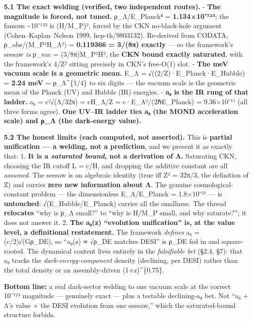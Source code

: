 \documentclass[
]{article}
\begin{document}
\textbf{5.1 The exact welding (verified, two independent routes).} -
\textbf{The magnitude is forced, not tuned.} ρ\_Λ/E\_Planck⁴ =
\textbf{1.134×10⁻¹²³}; the famous \textasciitilde10⁻¹²² is (H/M\_P)²,
forced by the CKN no-black-hole argument (Cohen--Kaplan--Nelson 1999,
hep-th/9803132). Re-derived from CODATA, ρ\_obs/(M\_P²H\_Λ²) =
\textbf{0.119366 = 3/(8π) exactly} --- so the framework's seesaw
\emph{is} ρ\_vac = (3/8π)M\_P²H², the \textbf{CKN bound exactly
saturated}, with the framework's 4/Z² sitting precisely in CKN's
free-O(1) slot. - \textbf{The meV vacuum scale is a geometric mean.}
E\_Λ = √((2/Z)·E\_Planck·E\_Hubble) = \textbf{2.24 meV} =
ρ\_Λ\^{}\{1/4\} to six digits --- the vacuum scale is the geometric mean
of the Planck (UV) and Hubble (IR) energies. - \textbf{a₀ is the IR rung
of that ladder.} a₀ = c²√(Λ/32π) = cH\_Λ/Z = c·E\_Λ²/(2ℏE\_Planck) =
9.36×10⁻¹¹ (all three forms agree). \textbf{One UV--IR ladder ties a₀
(the MOND acceleration scale) and ρ\_Λ (the dark-energy value).}

\textbf{5.2 The honest limits (each computed, not asserted).} This is
\textbf{partial unification --- a welding, not a prediction}, and we
present it as exactly that: 1. \textbf{It is a \emph{saturated bound},
not a derivation of Λ.} Saturating CKN, choosing the IR cutoff L = c/H,
and dropping the additive constant are all \emph{assumed}. The seesaw is
an algebraic identity (true iff Z² = 32π/3, the definition of Z) and
carries \textbf{zero new information about Λ}. The genuine
cosmological-constant problem --- the dimensionless E\_Λ/E\_Planck =
1.8×10⁻³¹ --- is \textbf{untouched}: √(E\_Hubble/E\_Planck) carries all
the smallness. The thread \textbf{relocates} ``why is ρ\_Λ small?'' to
``why is H/M\_P small, and why saturate?''; it does not answer it. 2.
\textbf{The a₀(z) ``evolution unification'' is, at the value level, a
definitional restatement.} The framework \emph{defines} a₀ =
(c/2)√(Gρ\_DE), so ``a₀(z) ∝ √ρ\_DE matches DESI'' is ρ\_DE fed in and
square-rooted. The dynamical content lives entirely in the
\emph{falsifiable bet} (§2.4, §7): that a₀ tracks the
\emph{dark-energy-component} density (declining, per DESI) rather than
the total density or an assembly-driven (1+z)\^{}\{0.75\}.

\textbf{Bottom line:} a real dark-sector welding to one vacuum scale at
the correct 10⁻¹²³ magnitude --- genuinely exact --- plus a testable
declining-a₀ bet. Not ``a₀ + Λ's value + the DESI evolution from one
seesaw,'' which the saturated-bound structure forbids.
\end{document}
